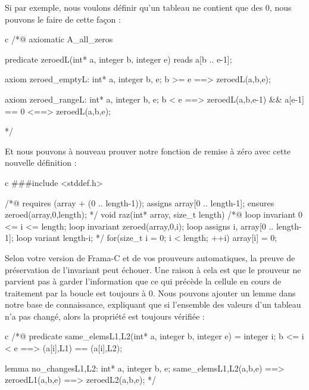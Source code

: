 Si par exemple, nous voulons définir qu'un tableau ne contient que des 0, nous
pouvons le faire de cette façon :



\begin{CodeBlock}{c}
/*@
  axiomatic A_all_zeros{
    predicate zeroed{L}(int* a, integer b, integer e) reads a[b .. e-1];

    axiom zeroed_empty{L}:
      \forall int* a, integer b, e; b >= e ==> zeroed{L}(a,b,e);
      
    axiom zeroed_range{L}:
      \forall int* a, integer b, e; b < e ==>
        zeroed{L}(a,b,e-1) && a[e-1] == 0 <==> zeroed{L}(a,b,e);
  }
*/
\end{CodeBlock}



Et nous pouvons à nouveau prouver notre fonction de remise à zéro avec cette
nouvelle définition :



\begin{CodeBlock}{c}
###include <stddef.h>

/*@
  requires \valid(array + (0 .. length-1));
  assigns  array[0 .. length-1];
  ensures  zeroed(array,0,length);
*/
void raz(int* array, size_t length){
  /*@
    loop invariant 0 <= i <= length;
    loop invariant zeroed(array,0,i);
    loop assigns i, array[0 .. length-1];
    loop variant length-i;
  */
  for(size_t i = 0; i < length; ++i)
    array[i] = 0;
}
\end{CodeBlock}



Selon votre version de Frama-C et de vos prouveurs automatiques, la preuve de 
préservation de l'invariant peut échouer. Une raison à cela est que le prouveur ne
parvient pas à garder l'information que ce qui précède la cellule en cours de
traitement par la boucle est toujours à 0. Nous pouvons ajouter un lemme dans
notre base de connaissance, expliquant que si l'ensemble des valeurs d'un tableau
n'a pas changé, alors la propriété est toujours vérifiée :



\begin{CodeBlock}{c}
/*@
  predicate same_elems{L1,L2}(int* a, integer b, integer e) =
    \forall integer i; b <= i < e ==> \at(a[i],L1) == \at(a[i],L2);

  lemma no_changes{L1,L2}:
  \forall int* a, integer b, e;
  same_elems{L1,L2}(a,b,e) ==> zeroed{L1}(a,b,e) ==> zeroed{L2}(a,b,e);
*/
\end{CodeBlock}



